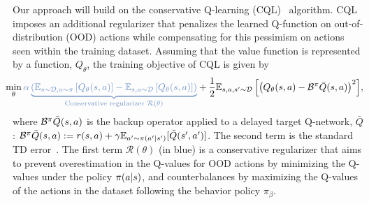 Our approach will build on the conservative Q-learning (CQL)~\cite{kumar2020conservative} algorithm.
CQL imposes an additional regularizer that penalizes the learned Q-function on out-of-distribution (OOD) actions while compensating for this pessimism on actions seen within the training dataset. Assuming that the value function is represented by a function, $Q_\theta$, the training objective of CQL is given by
\begin{align}
    \label{eqn:cql_training}
    \!\!\!\!\!\min_\theta {\color[HTML]{6C8EBF} {\alpha \underbrace{\left(\mathbb{E}_{s \sim \mathcal{D}, a \sim \pi} \left[Q_\theta(s,a)\right] - \mathbb{E}_{s, a \sim \mathcal{D}}\left[Q_\theta(s,a)\right]\right)}_{\text{Conservative regularizer }\mathcal{R}(\theta)}}} + \frac{1}{2} {\mathbb{E}_{s, a, s^\prime\sim \mathcal{D}}\left[\left(Q_\theta(s, a) - \bellman^\pi\bar{Q}(s, a)\right)^2 \right]},
\end{align}
where $\mathcal{B}^\pi \bar{Q} (s, a)$ is the backup operator applied to a delayed target Q-network, $\bar{Q}$: $\mathcal{B}^\pi \bar{Q}(s, a) := r(s, a) + \gamma \mathbb{E}_{a^\prime \sim \pi(a^\prime|s^\prime)}[\bar{Q}(s^\prime, a^\prime)]$. The second term is the standard TD error~\cite{lillicrap2015continuous,fujimoto2018addressing,haarnoja2018sacapps}. The first term  $\mathcal{R}(\theta)$ (in {\color[HTML]{6C8EBF} blue}) is a conservative regularizer that aims to prevent overestimation in the Q-values for OOD actions by minimizing the Q-values under the policy $\pi(a|s)$, and counterbalances by maximizing the Q-values of the actions in the dataset following the behavior policy $\pi_\beta$.

\vspace{-0.2cm}